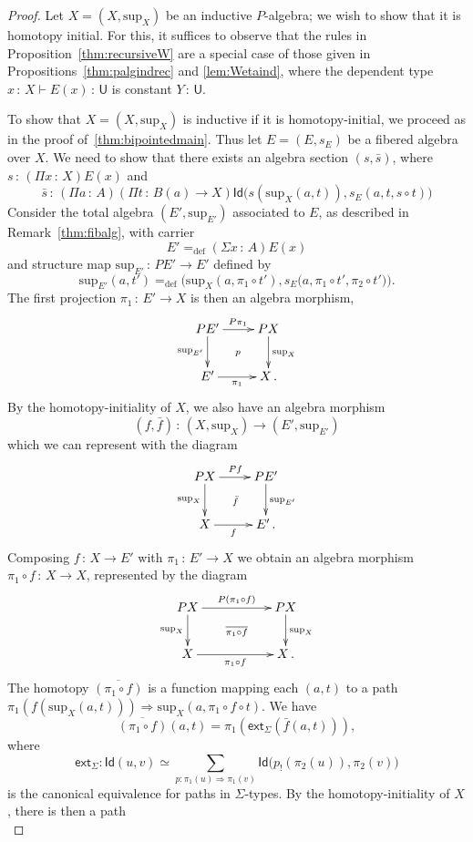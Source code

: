 \documentclass[10pt,a4paper,oneside,reqno]{amsart}
\theoremstyle{mythm}
\theoremstyle{mydef}
\theoremstyle{myrmk}
\newcommand{\defeq}{=_{\mathrm{def}}}
\newcommand{\co}{\,{:}\,}
\newcommand{\com}{\circ}
\newcommand{\ext}{\mathsf{ext}}
\newcommand{\idtodpair}{\ext_\Sigma}
\newcommand{\Id}{\mathsf{Id}}
\newcommand{\U}{\mathsf{U}}
\renewcommand{\sup}{\mathrm{sup}}
\begin{document}
\begin{proof}
Let $X = (X, \sup_X)$ be an inductive $P$-algebra; we wish to show that it is homotopy initial.
For this, it suffices to observe that the rules in Proposition~\ref{thm:recursiveW} are a special case of those given in Propositions~\ref{thm:palgindrec} and \ref{lem:Wetaind}, where the dependent type $x \co X \vdash E(x) \co \U$ is constant $Y \co \U$.

To show that $X = (X, \sup_X)$ is inductive if it is homotopy-initial, we proceed as in the proof of~\ref{thm:bipointedmain}. 
Thus let $E = (E, s_E)$ be a fibered algebra over $X$. We need to show that there
exists an algebra section $(s, \bar{s})$, where $s \co (\Pi x \co X) E(x)$ and 
\[ 
\bar{s} \co (\Pi a \co A)(\Pi t \co B(a) \to X) \Id \big( s(\sup_X(a,t)), s_E(a, t, s \circ t) \big)
\]
%
Consider the total algebra $(E', \sup_{E'})$ associated to $E$, as described in Remark~\ref{thm:fibalg}, with carrier 
\[
E' \defeq (\Sigma x \co A) E(x) 
\]
and structure map $\sup_{E'} \co PE' \to E'$ defined by
\[
\sup_{E'}(a,t') \defeq \Big(\sup_X(a,\pi_1 \circ t'), s_E\big(a,\pi_1 \circ t', \pi_2 \circ t'\big)\Big) .
\]
The first projection $\pi_1 \co E' \to X$ is then an algebra morphism,
\[
\xymatrix{
PE' \ar[r]^{P\pi_1} \ar[d]_-{\sup_{E'}} \ar@{}[rd]|{p} & PX \ar[d]^{\sup_X} \\ 
E'  \ar[r]_-{\pi_1} & X \, .}
 \]
%
By the homotopy-initiality of $X$, we also have an algebra morphism 
\[
(f, \bar{f}) \co (X, \sup_X)  \to (E', \sup_{E'}) 
\]
which we can represent with the diagram
\[
\xymatrix{
PX \ar[r]^{Pf} \ar[d]_-{\sup_{X}} \ar@{}[rd]|{\bar{f}} & PE' \ar[d]^{\sup_{E'}} \\ 
X  \ar[r]_-{f} & E' \, .}
 \]
%
Composing $f \co X \to E'$ with $\pi_1 \co E' \to X$ we obtain an algebra morphism $\pi_1 \com f \co X \to X$, represented by the diagram
\[
\xymatrix{
PX \ar[rr]^{P(\pi_1 \com f)} \ar[d]_-{\sup_{X}} \ar@{}[rrd]|{\overline{\pi_1 \com f}} && PX \ar[d]^{\sup_{X}} \\ 
X  \ar[rr]_-{\pi_1 \com f} && X \, .}
 \]
%
The homotopy $\overline{(\pi_1 \com f)}$ is a function mapping each $(a,t)$ to
a path $\pi_1(f(\sup_X(a,t))) \Rightarrow \sup_X(a, \pi_1 \circ f \circ t)$. We have
\[
\overline{(\pi_1 \com f)}(a,t) = \pi_1(\idtodpair(\bar{f}(a,t))) ,
\]
where $$\idtodpair : \Id(u,v) \simeq \sum_{p : \pi_1(u) \Rightarrow \pi_1(v)} \Id\big(p_{!}(\pi_2(u)), \pi_2(v)\big)$$ is the canonical equivalence for paths in $\Sigma$-types. 
By the homotopy-initiality of $X$,  there is then a path
\begin{equation*}

\end{equation*}
\end{proof}
\end{document}
